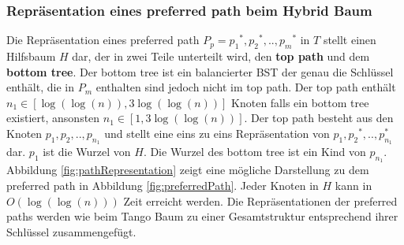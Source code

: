\documentclass[a4paper,12pt]{article}
\begin{document}
\subsubsection{Repräsentation eines preferred path beim Hybrid Baum} 
Die Repräsentation eines preferred path  $P_p = {p_1}^*,{p_2}^*,..,{p_m}^*$ in $T$ stellt einen Hilfsbaum $H$ dar, der in zwei Teile unterteilt wird, den  \textbf{top path} und dem \textbf{bottom tree}. Der bottom tree ist ein balancierter BST der genau die Schlüssel enthält, die in $P_m$ enthalten sind jedoch nicht im top path.  Der top path enthält $n_1 \in \left[\log\left(\log\left(n\right)\right), 3 \log\left(\log\left(n\right)\right) \right]$ Knoten falls ein bottom tree existiert, ansonsten  $n_1 \in \left[1, 3 \log\left(\log\left(n\right)\right) \right]$. Der top path besteht aus den Knoten ${p_1},{p_2},..,{p_{n_1}}$ und stellt eine eins zu eins Repräsentation von $ {p_1},{p_2}^*,..,p_{n_1}^*$ dar. ${p_1}$ ist die Wurzel von $H$. Die Wurzel des bottom tree ist ein Kind von ${p_{n_1}}$. Abbildung \ref{fig:pathRepresentation} zeigt eine mögliche Darstellung zu dem preferred path in Abbildung \ref{fig:preferredPath}. Jeder Knoten in $H$ kann in $O\left(\log\left(\log \left(n\right)\right)\right)$ Zeit erreicht werden. Die Repräsentationen der preferred paths werden wie beim Tango Baum zu einer Gesamtstruktur entsprechend ihrer Schlüssel zusammengefügt. 
\end{document}
